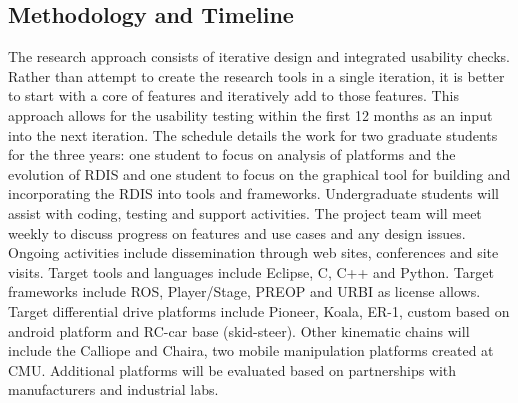\subsection{Methodology and Timeline}
The research approach consists of iterative design and integrated usability checks.  Rather than attempt to create the research tools in a single iteration, it is better to start with a core of features and iteratively add to those features. This approach allows for the usability testing within the first 12 months as an input into the next iteration.  The schedule details the work for two graduate students for the three years: one student to focus on analysis of platforms and the evolution of RDIS and one student to focus on the graphical tool for building and incorporating the RDIS into tools and frameworks.  Undergraduate students will assist with coding, testing and support activities.  The project team will meet weekly to discuss progress on features and use cases and any design issues.  Ongoing activities include dissemination through web sites, conferences and site visits.    Target tools and languages include Eclipse, C, C++ and Python.  Target frameworks include ROS, Player/Stage, PREOP and URBI as license allows.  Target differential drive platforms include Pioneer, Koala, ER-1, custom based on android platform and RC-car base (skid-steer).  Other kinematic chains will include the Calliope and Chaira, two mobile manipulation platforms created at CMU.  Additional platforms will be evaluated based on partnerships with manufacturers and industrial labs.
